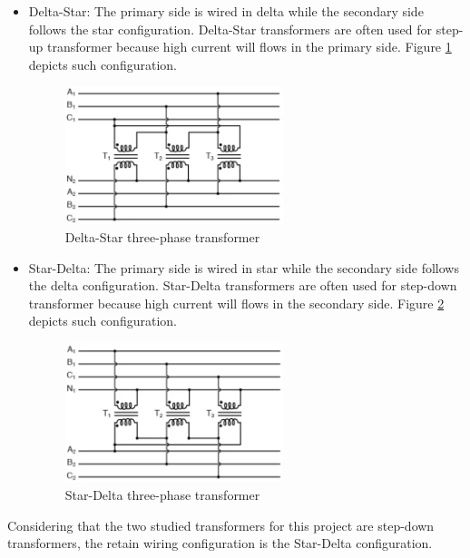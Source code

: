 \documentclass[12pt,a4paper]{report}
\begin{document}
\begin{itemize}
    \item Delta-Star: The primary side is wired in delta while the secondary side follows the star configuration. Delta-Star transformers are often used for step-up transformer because high current will flows in the primary side. Figure \ref{fig:delta-star transformer} depicts such configuration. 
    \begin{figure}[h]
    \centering
    \includegraphics[width=0.6\textwidth]{delta-y.PNG}
    \caption{Delta-Star three-phase transformer}
    \label{fig:delta-star transformer}
    \end{figure}
    
    \item Star-Delta: The primary side is wired in star while the secondary side follows the delta configuration. Star-Delta transformers are often used for step-down transformer because high current will flows in the secondary side. Figure \ref{fig:star-delta transformer} depicts such configuration.  
    \begin{figure}[h]
    \centering
    \includegraphics[width=0.6\textwidth]{y-delta.PNG}
    \caption{Star-Delta three-phase transformer}
    \label{fig:star-delta transformer}
    \end{figure}
\end{itemize}

Considering that the two studied transformers for this project are step-down transformers, the retain wiring configuration is the Star-Delta configuration.
\end{document}
